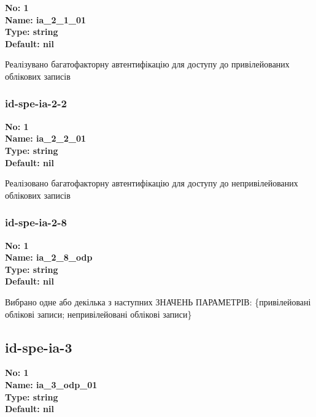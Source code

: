 \documentclass{article}
\begin{document}
\vspace{10pt}
{\footnotesize\bfseries
No: 1\\
Name: ia\_\allowbreak{}2\_\allowbreak{}1\_\allowbreak{}01\\
Type: string\\
Default: nil
}

{\footnotesize Реалізувано багатофакторну автентифікацію для доступу до привілейованих облікових записів}




\subsubsection{id-spe-ia-2-2}


\vspace{10pt}
{\footnotesize\bfseries
No: 1\\
Name: ia\_\allowbreak{}2\_\allowbreak{}2\_\allowbreak{}01\\
Type: string\\
Default: nil
}

{\footnotesize Реалізовано багатофакторну автентифікацію для доступу до непривілейованих облікових записів}




\subsubsection{id-spe-ia-2-8}


\vspace{10pt}
{\footnotesize\bfseries
No: 1\\
Name: ia\_\allowbreak{}2\_\allowbreak{}8\_\allowbreak{}odp\\
Type: string\\
Default: nil
}

{\footnotesize Вибрано одне або декілька з наступних ЗНАЧЕНЬ ПАРАМЕТРІВ: \{привілейовані облікові записи; непривілейовані облікові записи\}}




\subsection{id-spe-ia-3}


\vspace{10pt}
{\footnotesize\bfseries
No: 1\\
Name: ia\_\allowbreak{}3\_\allowbreak{}odp\_\allowbreak{}01\\
Type: string\\
Default: nil
}
\end{document}
